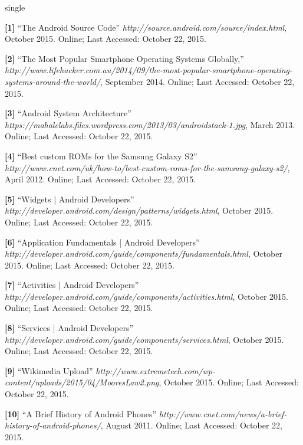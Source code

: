 \documentclass[12pt]{uthesis-v12}  %
\begin{document}
\begin{referencelist}{single}
	
	\item \textbf{[1]} ``The Android Source Code''
	\emph{http://source.android.com/source/index.html}, October 2015. 
	Online; Last Accessed: October 22, 2015.	
	
	\item \textbf{[2]} ``The Most Popular Smartphone Operating Systems Globally,''
	      \emph{http://www.lifehacker.com.au/2014/09/the-most-popular-smartphone-operating-systems-around-the-world/}, September 2014. 
	      Online; Last Accessed: October 22, 2015.
	
	\item \textbf{[3]} ``Android System Architecture''
		\emph{https://mahalelabs.files.wordpress.com/2013/03/androidstack-1.jpg}, March 2013. 
		Online; Last Accessed: October 22, 2015. 
		
	\item \textbf{[4]} ``Best custom ROMs for the Samsung Galaxy S2''
		\emph{http://www.cnet.com/uk/how-to/best-custom-roms-for-the-samsung-galaxy-s2/}, April 2012. 
		Online; Last Accessed: October 22, 2015. 
		
	\item \textbf{[5]} ``Widgets | Android Developers''
		\emph{http://developer.android.com/design/patterns/widgets.html}, October 2015. 
		Online; Last Accessed: October 22, 2015.
		
	\item \textbf{[6]} ``Application Fundamentals | Android Developers''
		\emph{http://developer.android.com/guide/components/fundamentals.html}, October 2015. 
		Online; Last Accessed: October 22, 2015.
		
	\item \textbf{[7]} ``Activities | Android Developers''
	\emph{http://developer.android.com/guide/components/activities.html}, October 2015. 
	Online; Last Accessed: October 22, 2015.					     

	\item \textbf{[8]} ``Services | Android Developers''
	\emph{http://developer.android.com/guide/components/services.html}, October 2015. 
	Online; Last Accessed: October 22, 2015.
	
	\item \textbf{[9]} ``Wikimedia Upload''
	\emph{http://www.extremetech.com/wp-content/uploads/2015/04/MooresLaw2.png}, October 2015. 
	Online; Last Accessed: October 22, 2015.
	
	\item \textbf{[10]} ``A Brief History of Android Phones''
	\emph{http://www.cnet.com/news/a-brief-history-of-android-phones/}, August 2011. 
	Online; Last Accessed: October 22, 2015.
	

\end{referencelist}
\end{document}
